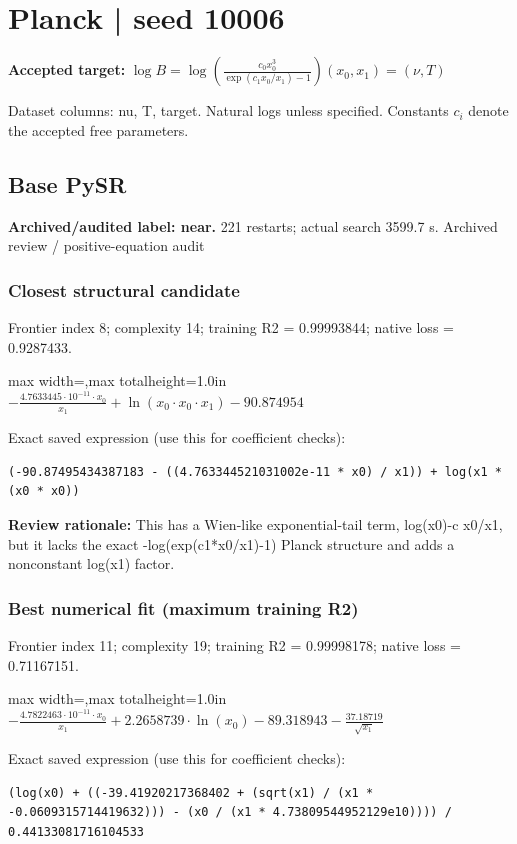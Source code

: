 \documentclass[10pt,letterpaper,landscape]{article}
\begin{document}
\section*{Planck | seed 10006}
\textbf{Accepted target:} $\displaystyle \log B=\log\!\left(\frac{c_0 x_0^3}{\exp(c_1x_0/x_1)-1}\right)$\hfill $(x_0,x_1)=(\nu,T)$\par
{\small Dataset columns: nu, T, target. Natural logs unless specified. Constants $c_i$ denote the accepted free parameters.}\par\medskip
\begin{minipage}[t]{0.485\textwidth}
\subsection*{Base PySR}
\textbf{Archived/audited label: near.} 221 restarts; actual search 3599.7 s.
{\small Archived review / positive-equation audit}
\subsubsection*{Closest structural candidate}
Frontier index 8; complexity 14; training R2 = 0.99993844; native loss = 0.9287433.
\begin{center}\begin{adjustbox}{max width=\linewidth,max totalheight=1.0in}$\displaystyle - \frac{4.7633445 \cdot 10^{-11} \cdot x_{0}}{x_{1}} + \ln{\left(x_{0} \cdot x_{0} \cdot x_{1} \right)} - 90.874954$\end{adjustbox}\end{center}
{\scriptsize Exact saved expression (use this for coefficient checks):}
\begin{lstlisting}
(-90.87495434387183 - ((4.763344521031002e-11 * x0) / x1)) + log(x1 * (x0 * x0))
\end{lstlisting}
{\small\textbf{Review rationale:} This has a Wien-like exponential-tail term, log(x0)-c x0/x1, but it lacks the exact -log(exp(c1*x0/x1)-1) Planck structure and adds a nonconstant log(x1) factor.}
\subsubsection*{Best numerical fit (maximum training R2)}
Frontier index 11; complexity 19; training R2 = 0.99998178; native loss = 0.71167151.
\begin{center}\begin{adjustbox}{max width=\linewidth,max totalheight=1.0in}$\displaystyle - \frac{4.7822463 \cdot 10^{-11} \cdot x_{0}}{x_{1}} + 2.2658739 \cdot \ln{\left(x_{0} \right)} - 89.318943 - \frac{37.18719}{\sqrt{x_{1}}}$\end{adjustbox}\end{center}
{\scriptsize Exact saved expression (use this for coefficient checks):}
\begin{lstlisting}
(log(x0) + ((-39.41920217368402 + (sqrt(x1) / (x1 * -0.0609315714419632))) - (x0 / (x1 * 4.73809544952129e10)))) / 0.44133081716104533
\end{lstlisting}
\end{minipage}\hfill
\end{document}
